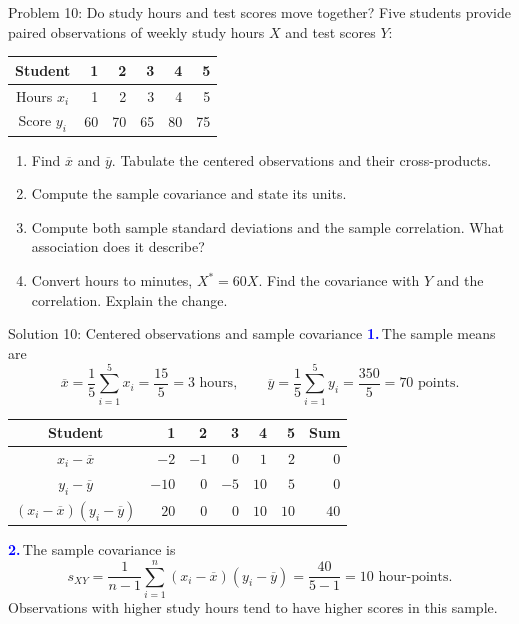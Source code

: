\documentclass[notes,10pt, aspectratio=169]{beamer}
\newif\ifshowsolutions
\newcommand{\answerpart}[1]{\textcolor{blue}{\textbf{#1.}}\,}
\begin{document}
\begin{frame}{Problem 10: Do study hours and test scores move together?}
Five students provide paired observations of weekly study hours $X$ and test scores $Y$:
\begin{center}
\begin{tabular}{c|rrrrr}
Student & 1 & 2 & 3 & 4 & 5 \\
\hline
Hours $x_i$ & 1 & 2 & 3 & 4 & 5 \\
Score $y_i$ & 60 & 70 & 65 & 80 & 75
\end{tabular}
\end{center}
\begin{enumerate}
\setlength{\itemsep}{7pt}
\item Find $\overline x$ and $\overline y$. Tabulate the centered observations and their cross-products.
\item Compute the sample covariance and state its units.
\item Compute both sample standard deviations and the sample correlation. What association does it describe?
\item Convert hours to minutes, $X^*=60X$. Find the covariance with $Y$ and the correlation. Explain the change.
\end{enumerate}
\end{frame}

\ifshowsolutions
\begin{frame}{Solution 10: Centered observations and sample covariance}
\small
\answerpart{1}The sample means are
\[
\overline x=\frac15\sum_{i=1}^5x_i=\frac{15}{5}=3\text{ hours},
\qquad
\overline y=\frac15\sum_{i=1}^5y_i=\frac{350}{5}=70\text{ points}.
\]
\begin{center}
\begin{tabular}{c|rrrrr|r}
Student & 1 & 2 & 3 & 4 & 5 & Sum \\
\hline
$x_i-\overline x$ & $-2$ & $-1$ & $0$ & $1$ & $2$ & $0$ \\
$y_i-\overline y$ & $-10$ & $0$ & $-5$ & $10$ & $5$ & $0$ \\
$(x_i-\overline x)(y_i-\overline y)$ & $20$ & $0$ & $0$ & $10$ & $10$ & $40$
\end{tabular}
\end{center}
\answerpart{2}The sample covariance is
\[
s_{XY}=\frac1{n-1}\sum_{i=1}^n(x_i-\overline x)(y_i-\overline y)
=\frac{40}{5-1}=\boxed{10\text{ hour-points}}.
\]
Observations with higher study hours tend to have higher scores in this sample.
\end{frame}
\end{document}
